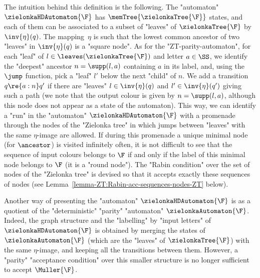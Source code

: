 \documentclass{theoretics}
\begin{document}
The intuition behind this definition is the following. The "automaton" $\zielonkaHDAutomaton{\F}$ has $\memTree{\zielonkaTree{\F}}$ states, and each of them can be associated to a subset of "leaves" of $\zielonkaTree{\F}$ by $\inv{\eta}(q)$. The mapping~$\eta$ is such that the lowest common ancestor of two "leaves" in  $\inv{\eta}(q)$ is a "square node".
As for the "ZT-parity-automaton", for each "leaf" of $l\in \leaves(\zielonkaTree{\F})$ and letter $a\in \SS$, we identify the "deepest" ancestor $n=\supp(l,a)$ containing $a$ in its label, and, using the $\jump$ function, pick a "leaf" $l'$ below the next "child" of $n$. We add a transition $q\re{a:n}q'$ if there are "leaves" $l\in \inv{\eta}(q)$ and $l'\in \inv{\eta}(q')$ giving such a path (we note that the output colour is given by $n=\supp(l,a)$, although this node does not appear as a state of the automaton). This way, we can identify a "run" in the "automaton" $\zielonkaHDAutomaton{\F}$ with a promenade through the nodes of the "Zielonka tree" in which jumps between "leaves" with the same $\eta$-image are allowed. If during this promenade a unique minimal node (for $\ancestor$) is visited infinitely often, it is not difficult to see that the sequence of input colours belongs to $\F$ if and only if the label of this minimal node belongs to $\F$ (it is a "round node"). The "Rabin condition" over the set of nodes of the "Zielonka tree" is devised so that it accepts exactly these sequences of nodes (see Lemma~\ref{lemma-ZT:Rabin-acc-sequences-nodes-ZT} below). 

Another way of presenting the "automaton" $\zielonkaHDAutomaton{\F}$ is as a quotient of the "deterministic" "parity" "automaton" $\zielonkaAutomaton{\F}$. Indeed, the graph structure and the "labelling" by "input letters" of $\zielonkaHDAutomaton{\F}$ is obtained by merging the states of $\zielonkaAutomaton{\F}$ (which are the "leaves" of $\zielonkaTree{\F}$) with the same $\eta$-image, and keeping all the transitions between them. However, a "parity" "acceptance condition" over this smaller structure is no longer sufficient to accept $\Muller{\F}$.
\end{document}
